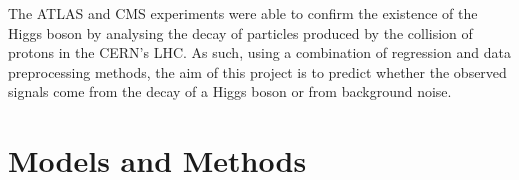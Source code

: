 \documentclass[10pt,conference,compsocconf]{IEEEtran}
\begin{document}

The ATLAS and CMS experiments were able to confirm the existence of 
the Higgs boson by analysing the decay of particles produced by 
the collision of protons in the CERN's LHC. 
As such, using a combination of regression and data preprocessing 
methods, the aim of this project is to predict whether the observed 
signals come from the decay of a Higgs boson or from background noise.

\section{Models and Methods}


\end{document}
